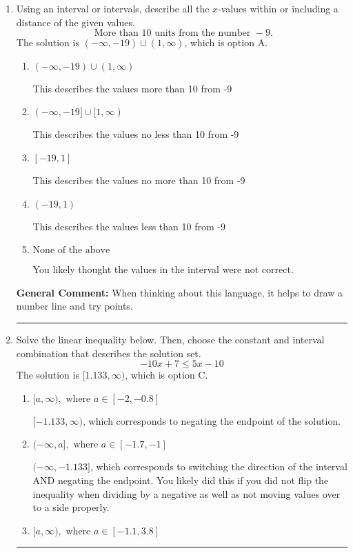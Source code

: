 \documentclass{extbook}[14pt]
\newcommand{\litem}[1]{\item #1

\rule{\textwidth}{0.4pt}}
\begin{document}
\begin{enumerate}
{\begin{enumerate}[label=\Alph*.]
Corresponds to including the endpoints (when they should be excluded).
\item \( (-\infty, \infty) \)

Corresponds to the variable canceling, which does not happen in this instance.
\end{enumerate}

\textbf{General Comment:} When multiplying or dividing by a negative, flip the sign.
}
\litem{
Using an interval or intervals, describe all the $x$-values within or including a distance of the given values.
\[ \text{ More than } 10 \text{ units from the number } -9. \]The solution is \( (-\infty, -19) \cup (1, \infty) \), which is option A.\begin{enumerate}[label=\Alph*.]
\item \( (-\infty, -19) \cup (1, \infty) \)

This describes the values more than 10 from -9
\item \( (-\infty, -19] \cup [1, \infty) \)

This describes the values no less than 10 from -9
\item \( [-19, 1] \)

This describes the values no more than 10 from -9
\item \( (-19, 1) \)

This describes the values less than 10 from -9
\item \( \text{None of the above} \)

You likely thought the values in the interval were not correct.
\end{enumerate}

\textbf{General Comment:} When thinking about this language, it helps to draw a number line and try points.
}
\litem{
Solve the linear inequality below. Then, choose the constant and interval combination that describes the solution set.
\[ -10x + 7 \leq 5x -10 \]The solution is \( [1.133, \infty) \), which is option C.\begin{enumerate}[label=\Alph*.]
\item \( [a, \infty), \text{ where } a \in [-2, -0.8] \)

 $[-1.133, \infty)$, which corresponds to negating the endpoint of the solution.
\item \( (-\infty, a], \text{ where } a \in [-1.7, -1] \)

 $(-\infty, -1.133]$, which corresponds to switching the direction of the interval AND negating the endpoint. You likely did this if you did not flip the inequality when dividing by a negative as well as not moving values over to a side properly.
\item \( [a, \infty), \text{ where } a \in [-1.1, 3.8] \)


\end{enumerate}}
\end{enumerate}
\end{document}
